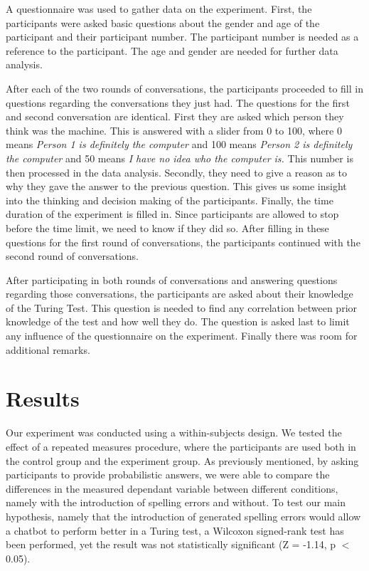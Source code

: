 A questionnaire was used to gather data on the experiment. First, the participants were asked basic questions about the gender and age of the participant and their participant number. The participant number is needed as a reference to the participant. The age and gender are needed for further data analysis.

After each of the two rounds of conversations, the participants proceeded to fill in questions regarding the conversations they just had. The questions for the first and second conversation are identical. First they are asked which person they think was the machine. This is answered with a slider from 0 to 100, where 0 means \textit{Person 1 is definitely the computer} and 100 means \textit{Person 2 is definitely the computer} and 50 means \textit{I have no idea who the computer is.} This number is then processed in the data analysis. Secondly, they need to give a reason as to why they gave the answer to the previous question. This gives us some insight into the thinking and decision making of the participants. Finally, the time duration of the experiment is filled in. Since participants are allowed to stop before the time limit, we need to know if they did so. After filling in these questions for the first round of conversations, the participants continued with the second round of conversations.

After participating in both rounds of conversations and answering questions regarding those conversations, the participants are asked about their knowledge of the Turing Test. This question is needed to find any correlation between prior knowledge of the test and how well they do. The question is asked last to limit any influence of the questionnaire on the experiment. Finally there was room for additional remarks.


\section{Results}
Our experiment was conducted using a within-subjects design. We tested the effect of a repeated measures procedure, where the participants are used both in the control group and the experiment group. As previously mentioned, by asking participants to provide probabilistic answers, we were able to compare the differences in the measured dependant variable between different conditions, namely with the introduction of spelling errors and without. To test our main hypothesis, namely that the introduction of generated spelling errors would allow a chatbot to perform better in a Turing test, a Wilcoxon signed-rank test has been performed, yet the result was not statistically significant (Z = -1.14, p $<$ 0.05).


